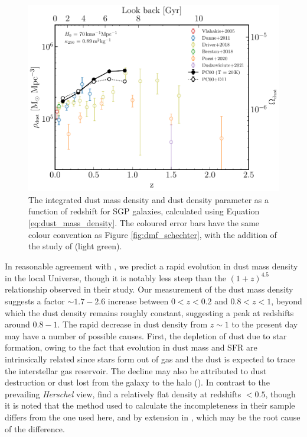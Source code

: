 \begin{figure}
	\centering
	\includegraphics[width=0.8\columnwidth]{Figures/Figure_3_8.pdf}
	\caption[Integrated dust mass density as a function of redshift]{The integrated dust mass density and dust density parameter as a function of redshift for SGP galaxies, calculated using Equation \ref{eq:dust_mass_density}. The coloured error bars have the same colour convention as Figure \ref{fig:dmf_schechter}, with the addition of the study of \citealt{Driver_2018} (light green).}
	\label{fig:dmd}
\end{figure}

In reasonable agreement with \citealt{Dunne_2011}, we predict a rapid evolution in dust mass density in the local Universe, though it is notably less steep than the $(1+z)^{4.5}$ relationship observed in their study. Our measurement of the dust mass density suggests a factor $\sim 1.7 - 2.6$ increase between $0 < z < 0.2$ and $0.8 < z < 1$, beyond which the dust density remains roughly constant, suggesting a peak at redshifts around $0.8 - 1$. The rapid decrease in dust density from $z \sim 1$ to the present day may have a number of possible causes. First, the depletion of dust due to star formation, owing to the fact that evolution in dust mass and SFR are intrinsically related since stars form out of gas and the dust is expected to trace the interstellar gas reservoir. The decline may also be attributed to dust destruction or dust lost from the galaxy to the halo (\citealt{Dunne_2011}). In contrast to the prevailing \textit{Herschel} view, \citealt{Driver_2018} find a relatively flat density at redshifts $< 0.5$, though it is noted that the method used to calculate the incompleteness in their sample differs from the one used here, and by extension in \citealt{Dunne_2011}, which may be the root cause of the difference.

